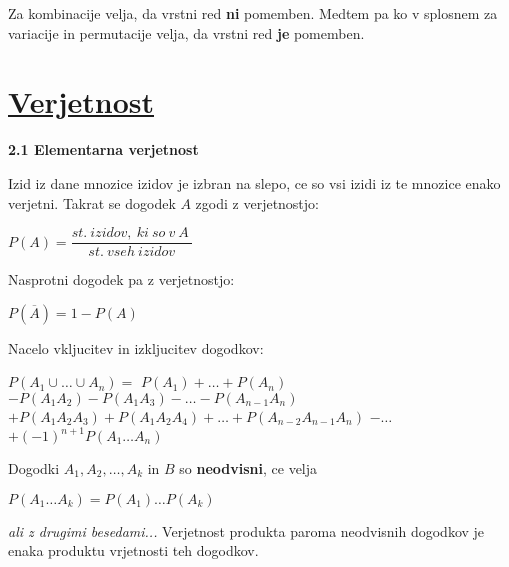 \documentclass{article}
\begin{document}
\begin{multicols}{2}
\begin{small}
\begin{center}
    \end{center}        

Za kombinacije velja, da vrstni red \textbf{ni} pomemben. Medtem pa
ko v splosnem za variacije in permutacije velja, da vrstni red \textbf{je}
pomemben.
\end{small}


\section{\underline{Verjetnost}}


\textbf{2.1 Elementarna verjetnost}
\smallskip

Izid iz dane mnozice izidov je izbran na slepo, ce so vsi izidi
iz te mnozice enako verjetni. Takrat se dogodek $A$ zgodi z verjetnostjo:
\begin{center}
    \begin{math}
        P(A) = \dfrac{st.\: izidov,\: ki\: so\: v\: A\:}{st.\: vseh\: izidov}
    \end{math}    
\end{center}
Nasprotni dogodek pa z verjetnostjo:
\begin{center}
    \begin{math}
        P(\overline{A}) = 1 - P(A)
    \end{math}    
\end{center}
Nacelo vkljucitev in izkljucitev dogodkov:
\begin{center}
    \begin{small}
        \begin{math}
            P(A_{1} \cup \dots \cup A_{n}) =
        \end{math}
        \begin{math}
            P(A_{1}) + \dots + P(A_{n})
        \end{math}
        \begin{math}
            - P(A_{1} A_{2}) - P(A_{1} A_{3}) - \dots - P(A_{n - 1} A_{n})
        \end{math}
        \begin{math}
            + P(A_{1} A_{2} A_{3}) +P (A_{1} A_{2} A_{4}) + \dots + P(A_{n - 2} A_{n - 1} A_{n})
        \end{math}
        \begin{math}
            - \dots
        \end{math}
        \begin{math}
            + (-1)^{n + 1} P(A_{1} \dots A_{n})
        \end{math}
    \end{small}
\end{center}
Dogodki $A_{1}, A_{2}, \dots , A_{k}$ in $B$ so \textbf{neodvisni}, ce velja
\begin{center}
    \begin{math}
        P(A_{1} \dots A_{k}) = P(A_{1}) \dots P(A_{k})
    \end{math}
\end{center}
\textit{ali z drugimi besedami...} Verjetnost produkta paroma neodvisnih
dogodkov je enaka produktu vrjetnosti teh dogodkov.


\end{multicols}
\end{document}
